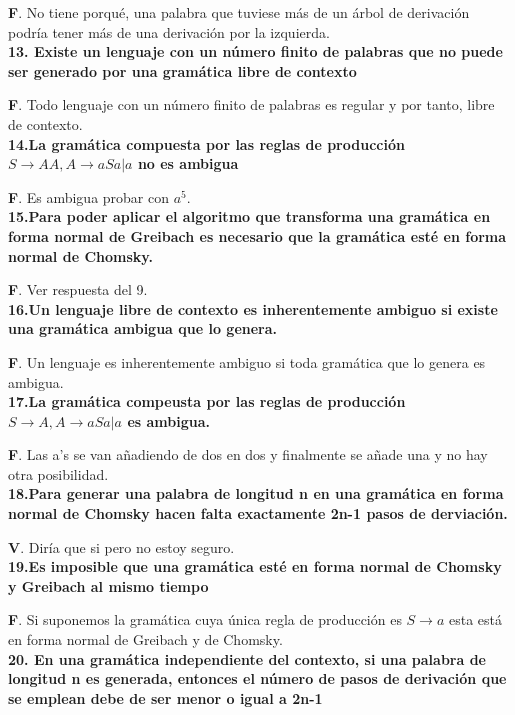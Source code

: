 \documentclass[a4paper,11pt]{article}
\begin{document}
\textbf{F}. No tiene porqué, una palabra que tuviese más de un árbol de derivación podría tener más de una derivación por la izquierda. \\

\textbf{13. Existe un lenguaje con un número finito de palabras que no puede ser generado por una gramática libre de contexto}

\textbf{F}. Todo lenguaje con un número finito de palabras es regular y por tanto, libre de contexto. \\

\textbf{14.La gramática compuesta por las reglas de producción $S \rightarrow AA, A\rightarrow aSa|a$ no es ambigua}

\textbf{F}. Es ambigua probar con $a^5$. \\

\textbf{15.Para poder aplicar el algoritmo que transforma una gramática en forma normal de Greibach es necesario que la gramática esté en forma normal de Chomsky.}

\textbf{F}. Ver respuesta del 9. \\

\textbf{16.Un lenguaje libre de contexto es inherentemente ambiguo si existe una gramática ambigua que lo genera.} 

\textbf{F}. Un lenguaje es inherentemente ambiguo si toda gramática que lo genera es ambigua. \\

\textbf{17.La gramática compeusta por las reglas de producción $S \rightarrow A, A\rightarrow aSa|a$ es ambigua.}

\textbf{F}. Las a's se van añadiendo de dos en dos y finalmente se añade una y no hay otra posibilidad. \\

\textbf{18.Para generar una palabra de longitud n en una gramática en forma normal de Chomsky hacen falta exactamente 2n-1 pasos de derviación.}

\textbf{V}. Diría que si pero no estoy seguro. \\

\textbf{19.Es imposible que una gramática esté en forma normal de Chomsky y Greibach al mismo tiempo}

\textbf{F}. Si suponemos la gramática cuya única regla de producción es $S\rightarrow a$ esta está en forma normal de Greibach y de Chomsky.\\

\textbf{20. En una gramática independiente del contexto, si una palabra de longitud n es generada, entonces el número de pasos de derivación que se emplean debe de ser menor o igual a 2n-1} 
\end{document}
